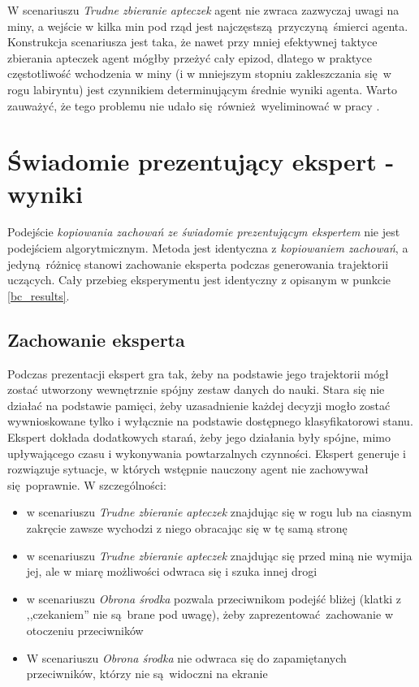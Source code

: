 \documentclass[polish,master,a4paper,oneside]{ppfcmthesis}
\begin{document}
W scenariuszu \textit{Trudne zbieranie apteczek} agent nie zwraca zazwyczaj uwagi na miny, a wejście w kilka min pod rząd jest najczęstszą przyczyną śmierci agenta. Konstrukcja scenariusza jest taka, że nawet przy mniej efektywnej taktyce zbierania apteczek agent mógłby przeżyć cały epizod, dlatego w praktyce częstotliwość wchodzenia w miny (i w mniejszym stopniu zakleszczania się w rogu labiryntu) jest czynnikiem determinującym średnie wyniki agenta. Warto zauważyć, że tego problemu nie udało się również wyeliminować w pracy \cite{DBLP:journals/corr/KempkaWRTJ16}.
 \section{Świadomie prezentujący ekspert - wyniki}

Podejście \textit{kopiowania zachowań ze świadomie prezentującym ekspertem} nie jest podejściem algorytmicznym. Metoda jest identyczna z \textit{kopiowaniem zachowań}, a jedyną różnicę stanowi zachowanie eksperta podczas generowania trajektorii uczących. Cały przebieg eksperymentu jest identyczny z opisanym w punkcie \ref{bc_results}.
\subsection {Zachowanie eksperta}
Podczas prezentacji ekspert gra tak, żeby na podstawie jego trajektorii mógł zostać utworzony wewnętrznie spójny zestaw danych do nauki. Stara się nie działać na podstawie pamięci, żeby uzasadnienie każdej decyzji mogło zostać wywnioskowane tylko i wyłącznie na podstawie dostępnego klasyfikatorowi stanu. Ekspert dokłada dodatkowych starań, żeby jego działania były spójne, mimo upływającego czasu i wykonywania powtarzalnych czynności. Ekspert generuje i rozwiązuje sytuacje, w których wstępnie nauczony agent nie zachowywał się poprawnie. W szczególności:
\begin{itemize}
\item{w scenariuszu \textit{Trudne zbieranie apteczek} znajdując się w rogu lub na ciasnym zakręcie zawsze wychodzi z niego obracając się w tę samą stronę}
\item{w scenariuszu \textit{Trudne zbieranie apteczek} znajdując się przed miną nie wymija jej, ale w miarę możliwości odwraca się i szuka innej drogi}
\item{w scenariuszu \textit{Obrona środka} pozwala przeciwnikom podejść bliżej (klatki z ,,czekaniem'' nie są brane pod uwagę), żeby zaprezentować zachowanie w otoczeniu przeciwników}
\item{W scenariuszu \textit{Obrona środka} nie odwraca się do zapamiętanych przeciwników, którzy nie są widoczni na ekranie}
\end{itemize}
\end{document}
